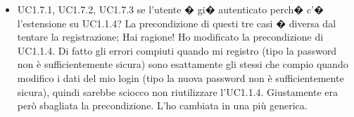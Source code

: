 \documentclass[11pt,a4paper]{article}
\begin{document}
\begin{itemize}
		\item UC1.7.1, UC1.7.2, UC1.7.3 se l'utente � gi� autenticato perch� c'� l'estensione su UC1.1.4? La precondizione di questi tre casi � diversa dal tentare la registrazione;
			\subitem Hai ragione! Ho modificato la precondizione di UC1.1.4. Di fatto gli errori compiuti quando mi registro (tipo la password non è sufficientemente sicura) sono esattamente gli stessi che compio quando modifico i dati del mio login (tipo la nuova password non è sufficientemente sicura), quindi sarebbe sciocco non riutilizzare l'UC1.1.4. Giustamente era però sbagliata la precondizione. L'ho cambiata in una più generica.
	\end{itemize}
\end{document}
